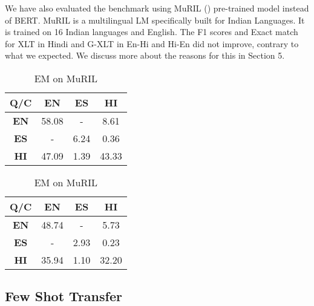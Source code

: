 \documentclass[12pt]{article}   %
\begin{document}
We have also evaluated the benchmark using MuRIL (\cite{muril}) pre-trained model instead of BERT. MuRIL is a multilingual LM specifically built for Indian Languages. It is trained on 16 Indian languages and English. The F1 scores and Exact match for XLT in Hindi and G-XLT in En-Hi and Hi-En did not improve, contrary to what we expected. We discuss more about the reasons for this in Section 5.

\begin{table}[H]
        \begin{minipage}{0.5\textwidth}
            \centering
		\begin{tabular}{|c|c|c|c|}
			\hline
 			\textbf{Q/C} &  \textbf{EN} &  \textbf{ES} &  \textbf{HI} \\
			\hline
			 \textbf{EN} & 58.08 & - &  8.61 \\
			\hline
			\textbf{ES} & - & 6.24 & 0.36 \\
			\hline
			\textbf{HI} & 47.09 & 1.39 & 43.33 \\
			\hline
		\end{tabular}
		\caption{F1 on MuRIL}
	\end{minipage}%
        \hfill
	\begin{minipage}{0.5\textwidth}
         	\centering
			\begin{tabular}{|c|c|c|c|}
				\hline
				 \textbf{Q/C} &  \textbf{EN} &  \textbf{ES} &  \textbf{HI} \\
				\hline
				\textbf{EN} & 48.74 & - & 5.73 \\
				 \hline
				\textbf{ES} & - & 2.93 & 0.23 \\
				\hline
				 \textbf{HI} & 35.94 & 1.10 & 32.20\\
				 \hline
			\end{tabular}
			\caption{EM on MuRIL}
	\end{minipage}%
\end{table}

\subsection{Few Shot Transfer}
\end{document}
